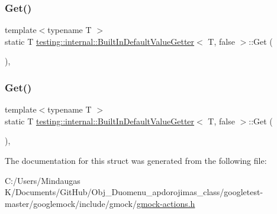 \mbox{\label{structtesting_1_1internal_1_1_built_in_default_value_getter_3_01_t_00_01false_01_4_a8c8e929666f61272961eea21a60de4ad}} 
\subsubsection{\texorpdfstring{Get()}{Get()}\hspace{0.1cm}{\footnotesize\ttfamily [2/3]}}
{\footnotesize\ttfamily template$<$typename T $>$ \\
static T \mbox{\hyperlink{structtesting_1_1internal_1_1_built_in_default_value_getter}{testing\+::internal\+::\+Built\+In\+Default\+Value\+Getter}}$<$ T, false $>$\+::Get (\begin{DoxyParamCaption}{ }\end{DoxyParamCaption})\hspace{0.3cm}{\ttfamily [inline]}, {\ttfamily [static]}}

\mbox{\label{structtesting_1_1internal_1_1_built_in_default_value_getter_3_01_t_00_01false_01_4_a8c8e929666f61272961eea21a60de4ad}} 
\subsubsection{\texorpdfstring{Get()}{Get()}\hspace{0.1cm}{\footnotesize\ttfamily [3/3]}}
{\footnotesize\ttfamily template$<$typename T $>$ \\
static T \mbox{\hyperlink{structtesting_1_1internal_1_1_built_in_default_value_getter}{testing\+::internal\+::\+Built\+In\+Default\+Value\+Getter}}$<$ T, false $>$\+::Get (\begin{DoxyParamCaption}{ }\end{DoxyParamCaption})\hspace{0.3cm}{\ttfamily [inline]}, {\ttfamily [static]}}



The documentation for this struct was generated from the following file\+:\begin{DoxyCompactItemize}
\item 
C\+:/\+Users/\+Mindaugas K/\+Documents/\+Git\+Hub/\+Obj\+\_\+\+Duomenu\+\_\+apdorojimas\+\_\+class/googletest-\/master/googlemock/include/gmock/\mbox{\hyperlink{googletest-master_2googlemock_2include_2gmock_2gmock-actions_8h}{gmock-\/actions.\+h}}\end{DoxyCompactItemize}
